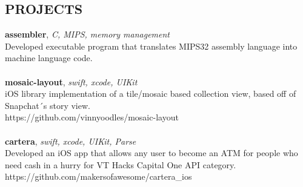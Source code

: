 \documentclass[line,margin]{res}
\begin{document}
\begin{resume}
	\section{PROJECTS}
	\textbf{assembler}, {\sl C, MIPS, memory management}\\ Developed executable program that translates MIPS32 assembly language into machine language code.\\\\
	\textbf{mosaic-layout}, {\sl swift, xcode, UIKit}\\ iOS library implementation of a tile/mosaic based collection view, based off of Snapchat´s story view.\\ https://github.com/vinnyoodles/mosaic-layout\\\\
	\textbf{cartera}, {\sl swift, xcode, UIKit, Parse}\\ Developed an iOS app that allows any user to become an ATM for people who need cash in a hurry for VT Hacks Capital One API category.\\ https://github.com/makersofawesome/cartera\_ios\\\\
	          
	\ 
\end{resume}
\end{document}
